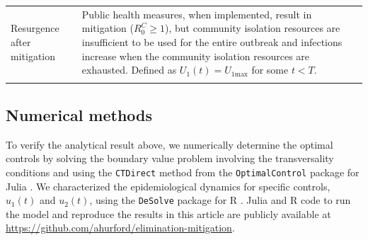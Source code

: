 \documentclass[pdflatex]{sn-jnl}
\theoremstyle{thmstyleone}%
\theoremstyle{thmstyletwo}%
\theoremstyle{thmstylethree}%
\begin{document}
\begin{table}[h]
\begin{tabular}{p{2cm}p{12cm}}
            \midrule
            Resurgence after mitigation & Public health measures, when implemented, result in mitigation ($R_0^C \geq 1$), but community isolation resources are insufficient to be used for the entire outbreak and infections increase when the community isolation resources are exhausted. Defined as $U_{1}(t) = U_{1\text{max}}$ for some $t<T$. \\
            \botrule
        \end{tabular}
        \label{tab:strategy-defns}
    \end{table}

\subsection{Numerical methods}

To verify the analytical result above, we numerically determine the optimal controls by solving the boundary value problem involving the transversality conditions and using the \texttt{CTDirect} method from the \texttt{OptimalControl} package for Julia \citep{Caillau_OptimalControl_jl_a_Julia}. We characterized the epidemiological dynamics for specific controls, $u_1(t)$ and $u_2(t)$, using the \texttt{DeSolve} package for R \citep{Soetaert2010deSolve}. Julia and R code to run the model and reproduce the results in this article are publicly available at \href{here}{https://github.com/ahurford/elimination-mitigation}.
\end{document}
